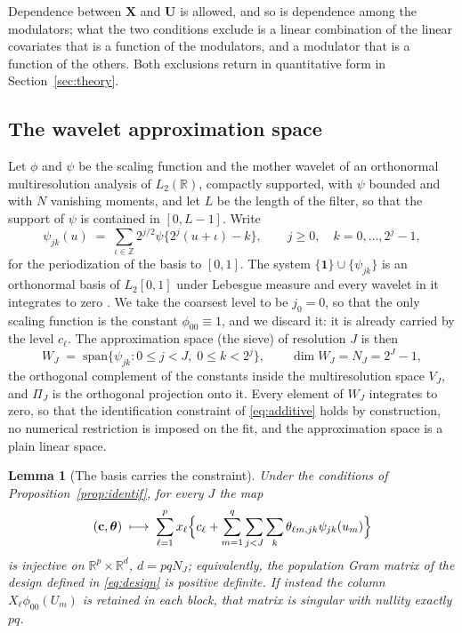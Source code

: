 \documentclass[12pt]{article} %
\newtheorem{lemma}{Lemma}
\theoremstyle{definition}
\theoremstyle{plain}
\newcommand{\R}{\mathbb{R}}
\newcommand{\cv}{\ell}
\newcommand{\md}{m}
\newcommand{\lev}{j}
\newcommand{\tsl}{k}
\newcommand{\jzero}{j_{0}}
\newcommand{\NJ}{N_{J}}
\newcommand{\bX}{\mathbf{X}}
\newcommand{\bU}{\mathbf{U}}
\newcommand{\lvl}[1]{c_{#1}}
\newcommand{\wav}[2]{\psi_{#1#2}}
\newcommand{\VJ}{V_{J}}
\newcommand{\WJ}{W_{J}}
\newcommand{\PiJ}{\Pi_{J}}
\newcommand{\coef}[4]{\theta_{#1#2,#3#4}}
\newcommand{\btheta}{\boldsymbol{\theta}}
\newcommand{\bc}{\mathbf{c}}
\begin{document}
Dependence between $\bX$ and $\bU$ is allowed, and so is dependence among the
modulators; what the two conditions exclude is a linear combination of the
linear covariates that is a function of the modulators, and a modulator that
is a function of the others. Both exclusions return in quantitative form in
Section~\ref{sec:theory}.

\subsection{The wavelet \texorpdfstring{\textcolor{colR1}{approximation space}}{approximation space}}
\label{sec:sieve}

Let $\phi$ and $\psi$ be the scaling function and the mother wavelet of an
orthonormal multiresolution analysis of $L_2(\R)$, compactly supported, with
$\psi$ bounded and with $N$ vanishing moments, and let $L$ be the length of
the filter, so that the support of $\psi$ is contained in $[0,L-1]$. Write
\begin{equation}
  \label{eq:periodized}
  \wav{\lev}{\tsl}(u) \;=\; \sum_{\iota \in \mathbb{Z}}
  2^{\lev/2}\psi\{2^{\lev}(u+\iota) - \tsl\},
  \qquad \lev \ge 0, \quad \tsl = 0,\dots,2^{\lev}-1,
\end{equation}
for the periodization of the basis to $[0,1]$. The system
$\{\mathbf{1}\}\cup\{\wav{\lev}{\tsl}\}$ is an orthonormal basis of
$L_2[0,1]$ under Lebesgue measure and every wavelet in it integrates to zero
\citep[Section 9.3]{Daubechies-1992}. We take the coarsest level to be
$\jzero = 0$, so that the only scaling function is the constant
$\phi_{00}\equiv 1$, and we discard it: it is already carried by the level
$\lvl{\cv}$. The \textcolor{colR1}{approximation space (the sieve)} of resolution $J$ is then
\[
  \WJ \;=\; \mathrm{span}\{\wav{\lev}{\tsl} : 0 \le \lev < J,\;
  0 \le \tsl < 2^{\lev}\},
  \qquad \dim \WJ = \NJ = 2^{J}-1,
\]
the orthogonal complement of the constants inside the multiresolution space
$\VJ$, and $\PiJ$ is the orthogonal projection onto it. Every element of $\WJ$
integrates to zero, so that the identification constraint of
\eqref{eq:additive} holds by construction, no numerical restriction is imposed
on the fit, and the \textcolor{colR1}{approximation space} is a plain linear space.

\begin{lemma}[The basis carries the constraint]
\label{lem:basis}
Under the conditions of Proposition~\ref{prop:identif}, for every $J$ the map
\[
  (\bc, \btheta) \;\longmapsto\;
  \sum_{\cv=1}^{p} x_{\cv}\Bigl\{\lvl{\cv} + \sum_{\md=1}^{q}
  \sum_{\lev<J}\sum_{\tsl} \coef{\cv}{\md}{\lev}{\tsl}
  \wav{\lev}{\tsl}(u_{\md})\Bigr\}
\]
is injective on $\R^{p}\times\R^{d}$, $d = pq\NJ$; equivalently, the
population Gram matrix of the design defined in \eqref{eq:design} is positive
definite. If instead the column $X_{\cv}\phi_{00}(U_{\md})$ is retained in
each block, that matrix is singular with nullity exactly $pq$.
\end{lemma}
\end{document}
